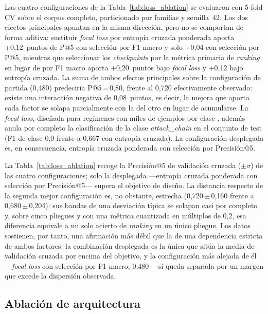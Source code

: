 Las cuatro configuraciones de la Tabla~\ref{tab:loss_ablation} se evaluaron con
5-fold \ac{CV} sobre el corpus completo, particionado por familias y semilla~42.
Los dos efectos principales apuntan en la misma dirección, pero no se comportan
de forma aditiva: sustituir \textit{focal loss} por entropía cruzada ponderada
aporta +0,12~puntos de P@5 con selección por F1 macro y solo +0,04 con selección
por P@5, mientras que seleccionar los \textit{checkpoints} por la métrica
primaria de \textit{ranking} en lugar de por F1 macro aporta +0,20~puntos bajo
\textit{focal loss} y +0,12 bajo entropía cruzada. La suma de ambos efectos
principales sobre la configuración de partida (0,480) predeciría
P@5\,=\,0,80, frente al 0,720 efectivamente observado: existe una interacción
negativa de 0,08~puntos, es decir, la mejora que aporta cada factor se solapa
parcialmente con la del otro en lugar de acumularse. La \textit{focal loss},
diseñada para regímenes con miles de ejemplos por clase \citep{Lin2017}, además
anula por completo la clasificación de la clase \textit{attack\_chain} en el
conjunto de test (F1 de clase 0,0 frente a 0,667 con entropía cruzada). La
configuración desplegada es, en consecuencia, entropía cruzada ponderada con
selección por Precisión@5.

La Tabla~\ref{tab:loss_ablation} recoge la Precisión@5 de validación cruzada
(\(\pm\)\(\sigma\)) de las cuatro configuraciones; solo la desplegada —entropía
cruzada ponderada con selección por Precisión@5— supera el objetivo de diseño.
La distancia respecto de la segunda mejor configuración es, no obstante, estrecha
(0,720\,\(\pm\)\,0,160 frente a 0,680\,\(\pm\)\,0,204): sus bandas de una
desviación típica se solapan casi por completo y, sobre cinco pliegues y con una
métrica cuantizada en múltiplos de 0,2, esa diferencia equivale a un solo acierto
de \textit{ranking} en un único pliegue. Los datos sostienen, por tanto, una
afirmación más débil que la de una dependencia estricta de ambos factores: la
combinación desplegada es la única que sitúa la media de validación cruzada por
encima del objetivo, y la configuración más alejada de él —\textit{focal loss}
con selección por F1 macro, 0,480— sí queda separada por un margen que excede la
dispersión observada.

\subsection{Ablación de arquitectura}
\label{sec:ablacion_arquitectura}

